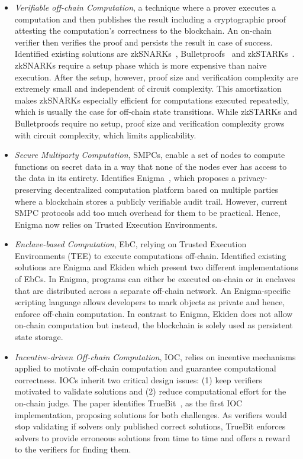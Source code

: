 \begin{itemize}
  \item \textit{Verifiable off-chain Computation}, a technique where a prover executes a computation and then publishes the result including a cryptographic proof attesting the computation’s correctness to the blockchain. An on-chain verifier then verifies the proof and persists the result in case of success. Identified existing solutions are zkSNARKs~\cite{Ben-SassonTechnionAlessandroChiesa2019}, Bulletproofs~\cite{Bunz2018} and zkSTARKs~\cite{Ben-Sasson2018}. zkSNARKs require a setup phase which is more expensive than naive execution. After the setup, however, proof size and verification complexity are extremely small and independent of circuit complexity. This amortization makes zkSNARKs especially efficient for computations executed repeatedly, which is usually the case for off-chain state transitions. While zkSTARKs and Bulletproofs require no setup, proof size and verification complexity grows with circuit complexity, which limits applicability.
  \item \textit{Secure Multiparty Computation}, SMPCs, enable a set of nodes to compute functions on secret data in a way that none of the nodes ever has access to the data in its entirety. Identifies Enigma~\cite{Tam2018}, which proposes a privacy-preserving decentralized computation platform based on multiple parties where a blockchain stores a publicly verifiable audit trail. However, current SMPC protocols add too much overhead for them to be practical. Hence, Enigma now relies on Trusted Execution Environments.
  \item \textit{Enclave-based Computation}, EbC, relying on Trusted Execution Environments (TEE) to execute computations off-chain. Identified existing solutions are Enigma and Ekiden \cite{Cheng2018} which present two different implementations of EbCs. In Enigma, programs can either be executed on-chain or in enclaves that are distributed across a separate off-chain network. An Enigma-specific scripting language allows developers to mark objects as private and hence, enforce off-chain computation. In contrast to Enigma, Ekiden does not allow on-chain computation but instead, the blockchain is solely used as persistent state storage.
  \item \textit{Incentive-driven Off-chain Computation}, IOC, relies on incentive mechanisms applied to motivate off-chain computation and guarantee computational correctness. IOCs inherit two critical design issues: (1) keep verifiers motivated to validate solutions and (2) reduce computational effort for the on-chain judge. The paper identifies TrueBit~\cite{Teutsch2017}, as the first IOC implementation, proposing solutions for both challenges. As verifiers would stop validating if solvers only published correct solutions, TrueBit enforces solvers to provide erroneous solutions from time to time and offers a reward to the verifiers for finding them.
\end{itemize}





